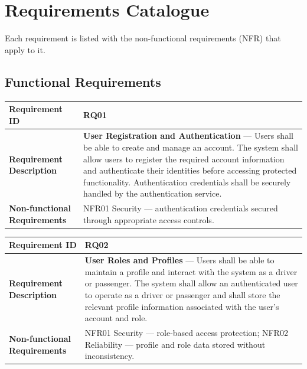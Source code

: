 \chapter{Requirements Catalogue}
\label{app:catalogue}

Each requirement is listed with the non-functional requirements (NFR) that apply to it.

\section{Functional Requirements}

\begin{minipage}{\textwidth}
\small
\begin{tabular}{|>{\raggedright\arraybackslash}p{}|>{\raggedright\arraybackslash}p{}|}
\hline
\textbf{Requirement ID} & RQ01 \\
\hline
\textbf{Requirement Description} & \textbf{User Registration and Authentication} --- Users shall be able to create and manage an account. The system shall allow users to register the required account information and authenticate their identities before accessing protected functionality. Authentication credentials shall be securely handled by the authentication service. \\
\hline
\textbf{Non-functional Requirements} & NFR01 Security --- authentication credentials secured through appropriate access controls. \\
\hline
\end{tabular}
\end{minipage}
\medskip
 
\begin{minipage}{\textwidth}
\small
\begin{tabular}{|>{\raggedright\arraybackslash}p{}|>{\raggedright\arraybackslash}p{}|}
\hline
\textbf{Requirement ID} & RQ02 \\
\hline
\textbf{Requirement Description} & \textbf{User Roles and Profiles} --- Users shall be able to maintain a profile and interact with the system as a driver or passenger. The system shall allow an authenticated user to operate as a driver or passenger and shall store the relevant profile information associated with the user's account and role. \\
\hline
\textbf{Non-functional Requirements} & NFR01 Security --- role-based access protection; \newline NFR02 Reliability --- profile and role data stored without inconsistency. \\
\hline
\end{tabular}
\end{minipage}
\medskip
 
